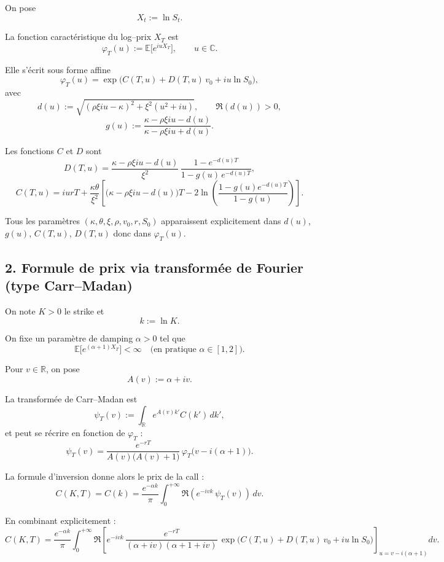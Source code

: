 \documentclass[11pt,a4paper]{article}
\newcommand{\1}{\mathbf{1}}
\begin{document}
On pose
\[
X_t := \ln S_t .
\]

La fonction caract\'eristique du log--prix $X_T$ est
\[
\varphi_T(u) := \mathbb{E}\big[e^{iuX_T}\big], \qquad u\in\mathbb{C}.
\]

Elle s'\'ecrit sous forme affine
\[
\boxed{\displaystyle
\varphi_T(u)
= \exp\Big(C(T,u) + D(T,u)\,v_0 + iu\ln S_0\Big),
}
\]
avec
\[
d(u) := \sqrt{(\rho\xi iu - \kappa)^2 + \xi^2(u^2+iu)},
\qquad \Re(d(u))>0,
\]
\[
g(u) := \frac{\kappa - \rho\xi iu - d(u)}{\kappa - \rho\xi iu + d(u)}.
\]

Les fonctions $C$ et $D$ sont
\[
\boxed{\displaystyle
D(T,u)
= \frac{\kappa - \rho\xi iu - d(u)}{\xi^2}
  \,\frac{1 - e^{-d(u)T}}{1 - g(u)\,e^{-d(u)T}},
}
\]
\[
\boxed{\displaystyle
C(T,u)
= iurT
+ \frac{\kappa\theta}{\xi^2}
  \left[
    \big(\kappa - \rho\xi iu - d(u)\big)T
    - 2\ln\!\left(\frac{1 - g(u)e^{-d(u)T}}{1 - g(u)}\right)
  \right].
}
\]

Tous les param\`etres $(\kappa,\theta,\xi,\rho,v_0,r,S_0)$ apparaissent
explicitement dans $d(u)$, $g(u)$, $C(T,u)$, $D(T,u)$ donc dans $\varphi_T(u)$.

\subsection*{2. Formule de prix via transform\'ee de Fourier (type Carr--Madan)}

On note $K>0$ le strike et
\[
k := \ln K .
\]

On fixe un param\`etre de damping $\alpha>0$ tel que
\[
\mathbb{E}\big[e^{(\alpha+1)X_T}\big] < \infty
\quad\text{(en pratique $\alpha\in[1,2]$).}
\]

Pour $v\in\mathbb{R}$, on pose
\[
A(v) := \alpha + iv.
\]

La transform\'ee de Carr--Madan est
\[
\psi_T(v)
:= \int_{\mathbb{R}} e^{A(v) k'} C(k')\,dk',
\]
et peut se r\'ecrire en fonction de $\varphi_T$ :
\[
\boxed{\displaystyle
\psi_T(v)
= \frac{e^{-rT}}{A(v)\big(A(v)+1\big)}\,
  \varphi_T\big(v - i(\alpha+1)\big).
}
\]

La formule d'inversion donne alors le prix de la call :
\[
\boxed{\displaystyle
C(K,T)
= C(k)
= \frac{e^{-\alpha k}}{\pi}
  \int_0^{+\infty}
    \Re\!\left(
      e^{-ivk}\,\psi_T(v)
    \right)\,dv.
}
\]

En combinant explicitement :
\[
\boxed{\displaystyle
C(K,T)
=
\frac{e^{-\alpha k}}{\pi}
\int_0^{+\infty}
\Re\!\left[
e^{-ivk}\,
\frac{e^{-rT}}{(\alpha+iv)(\alpha+1+iv)}\,
\exp\Big(
C(T,u) + D(T,u)\,v_0 + iu\ln S_0
\Big)
\right]_{u=v-i(\alpha+1)}
dv.
}
\]
\end{document}
